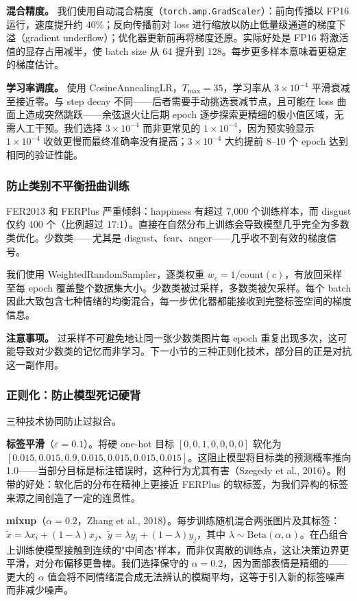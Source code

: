\documentclass[12pt,a4paper]{ctexart}
\begin{document}
\textbf{混合精度。} 我们使用自动混合精度（\texttt{torch.amp.GradScaler}）：前向传播以 FP16 运行，速度提升约 40\%；反向传播前对 loss 进行缩放以防止低量级通道的梯度下溢（gradient underflow）；优化器更新前再将梯度还原。实际好处是 FP16 将激活值的显存占用减半，使 batch size 从 64 提升到 128。每步更多样本意味着更稳定的梯度估计。

\textbf{学习率调度。} 使用 CosineAnnealingLR，$T_{\max}=35$，学习率从 $3\times10^{-4}$ 平滑衰减至接近零。与 step decay 不同——后者需要手动挑选衰减节点，且可能在 loss 曲面上造成突然跳跃——余弦退火让后期 epoch 逐步探索更精细的极小值区域，无需人工干预。我们选择 $3\times10^{-4}$ 而非更常见的 $1\times10^{-4}$，因为预实验显示 $1\times10^{-4}$ 收敛更慢而最终准确率没有提高；$3\times10^{-4}$ 大约提前 8--10 个 epoch 达到相同的验证性能。

\subsubsection{防止类别不平衡扭曲训练}

FER2013 和 FERPlus 严重倾斜：happiness 有超过 7,000 个训练样本，而 disgust 仅约 400 个（比例超过 17:1）。直接在自然分布上训练会导致模型几乎完全为多数类优化。少数类——尤其是 disgust、fear、anger——几乎收不到有效的梯度信号。

我们使用 WeightedRandomSampler，逐类权重 $w_c = 1 / \text{count}(c)$，有放回采样至每 epoch 覆盖整个数据集大小。少数类被过采样，多数类被欠采样。每个 batch 因此大致包含七种情绪的均衡混合，每一步优化器都能接收到完整标签空间的梯度信息。

\textbf{注意事项。} 过采样不可避免地让同一张少数类图片每 epoch 重复出现多次，这可能导致对少数类的记忆而非学习。下一小节的三种正则化技术，部分目的正是对抗这一副作用。

\subsubsection{正则化：防止模型死记硬背}

三种技术协同防止过拟合。

\textbf{标签平滑}（$\varepsilon=0.1$）。将硬 one-hot 目标 $[0,0,1,0,0,0,0]$ 软化为 $[0.015,0.015,0.9,0.015,0.015,0.015,0.015]$。这阻止模型将目标类的预测概率推向 1.0——当部分目标是标注错误时，这种行为尤其有害（Szegedy et al., 2016）。附带的好处：软化后的分布在精神上更接近 FERPlus 的软标签，为我们异构的标签来源之间创造了一定的连贯性。

\textbf{mixup}（$\alpha=0.2$，Zhang et al., 2018）。每步训练随机混合两张图片及其标签：$\tilde{x} = \lambda x_i + (1-\lambda) x_j$、$\tilde{y} = \lambda y_i + (1-\lambda) y_j$，其中 $\lambda \sim \text{Beta}(\alpha,\alpha)$。在凸组合上训练使模型接触到连续的"中间态"样本，而非仅离散的训练点，这让决策边界更平滑，对分布偏移更鲁棒。我们选择保守的 $\alpha=0.2$，因为面部表情是精细的——更大的 $\alpha$ 值会将不同情绪混合成无法辨认的模糊平均，这等于引入新的标签噪声而非减少噪声。
\end{document}
